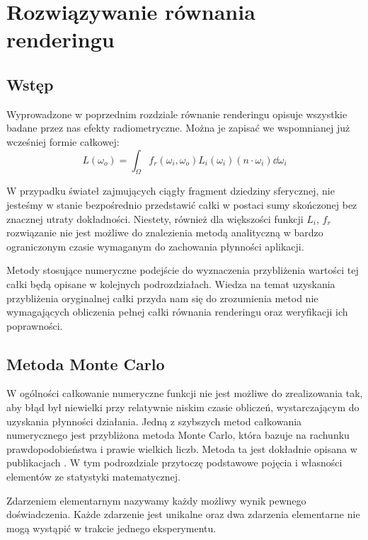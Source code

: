 \documentclass[../main.tex]{subfiles}
\begin{document}
\chapter{Rozwiązywanie równania renderingu}

\section{Wstęp}

Wyprowadzone w poprzednim rozdziale równanie renderingu opisuje wszystkie badane przez nas efekty radiometryczne. Można je zapisać we wspomnianej już wcześniej formie całkowej:
\[
  L(\omega_o) = \int_{\Omega} {
      f_r(\omega_i, \omega_o)
      L_i(\omega_i)
      (n \cdot \omega_i)
      \dd{\omega_i}
  }
\]

W przypadku świateł zajmujących ciągły fragment dziedziny sferycznej, nie jesteśmy w stanie bezpośrednio przedstawić całki w postaci sumy skończonej bez znacznej utraty dokładności. Niestety, również dla większości funkcji $L_i$, $f_r$ rozwiązanie nie jest możliwe do znalezienia metodą analityczną w bardzo ograniczonym czasie wymaganym do zachowania płynności aplikacji.

Metody stosujące numeryczne podejście do wyznaczenia przybliżenia wartości tej całki będą opisane w kolejnych podrozdziałach. Wiedza na temat uzyskania przybliżenia oryginalnej całki przyda nam się do zrozumienia metod nie wymagających obliczenia pełnej całki równania renderingu oraz weryfikacji ich poprawności.

\section{Metoda Monte Carlo}

W ogólności całkowanie numeryczne funkcji nie jest możliwe do zrealizowania tak, aby błąd był niewielki przy relatywnie niskim czasie obliczeń, wystarczającym do uzyskania płynności działania. Jedną z szybszych metod całkowania numerycznego jest przybliżona metoda Monte Carlo, która bazuje na rachunku prawdopodobieństwa i prawie wielkich liczb. Metoda ta jest dokładnie opisana w publikacjach \cite{Sierocinski,MonteCarloAnderson,Veach}. W tym podrozdziale przytoczę podstawowe pojęcia i własności elementów ze statystyki matematycznej.

Zdarzeniem elementarnym nazywamy każdy możliwy wynik pewnego doświadczenia. Każde zdarzenie jest unikalne oraz dwa zdarzenia elementarne nie mogą wystąpić w trakcie jednego eksperymentu.
\end{document}

